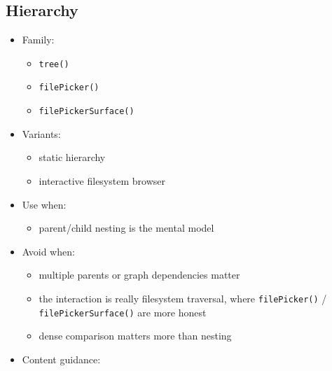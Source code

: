 \subsection{Hierarchy}\label{record-019-hierarchy}

\begin{itemize}
\tightlist
\item
  Family:

  \begin{itemize}
  \tightlist
  \item
    \texttt{t\allowbreak{}r\allowbreak{}e\allowbreak{}e\allowbreak{}(\allowbreak{})}
  \item
    \texttt{f\allowbreak{}i\allowbreak{}l\allowbreak{}e\allowbreak{}P\allowbreak{}i\allowbreak{}c\allowbreak{}k\allowbreak{}e\allowbreak{}r\allowbreak{}(\allowbreak{})}
  \item
    \texttt{f\allowbreak{}i\allowbreak{}l\allowbreak{}e\allowbreak{}P\allowbreak{}i\allowbreak{}c\allowbreak{}k\allowbreak{}e\allowbreak{}r\allowbreak{}S\allowbreak{}u\allowbreak{}r\allowbreak{}f\allowbreak{}a\allowbreak{}c\allowbreak{}e\allowbreak{}(\allowbreak{})}
  \end{itemize}
\item
  Variants:

  \begin{itemize}
  \tightlist
  \item
    static hierarchy
  \item
    interactive filesystem browser
  \end{itemize}
\item
  Use when:

  \begin{itemize}
  \tightlist
  \item
    parent/child nesting is the mental model
  \end{itemize}
\item
  Avoid when:

  \begin{itemize}
  \tightlist
  \item
    multiple parents or graph dependencies matter
  \item
    the interaction is really filesystem traversal, where \texttt{f\allowbreak{}i\allowbreak{}l\allowbreak{}e\allowbreak{}P\allowbreak{}i\allowbreak{}c\allowbreak{}k\allowbreak{}e\allowbreak{}r\allowbreak{}(\allowbreak{})} / \texttt{f\allowbreak{}i\allowbreak{}l\allowbreak{}e\allowbreak{}P\allowbreak{}i\allowbreak{}c\allowbreak{}k\allowbreak{}e\allowbreak{}r\allowbreak{}S\allowbreak{}u\allowbreak{}r\allowbreak{}f\allowbreak{}a\allowbreak{}c\allowbreak{}e\allowbreak{}(\allowbreak{})} are more honest
  \item
    dense comparison matters more than nesting
  \end{itemize}
\item
  Content guidance:


\end{itemize}
